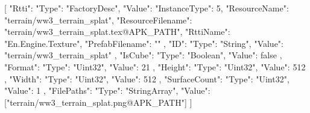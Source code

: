 [{
        "Rtti": {
            "Type": "FactoryDesc",
            "Value": {
                "InstanceType": 5,
                "ResourceName": "terrain/ww3_terrain_splat",
                "ResourceFilename": "terrain/ww3_terrain_splat.tex@APK_PATH",
                "RttiName": "En.Engine.Texture",
                "PrefabFilename": ""
            }
        },
        "ID": {
            "Type": "String",
            "Value": "terrain/ww3_terrain_splat"
        },
        "IsCube": {
            "Type": "Boolean",
            "Value": false
        },
        "Format": {
            "Type": "Uint32",
            "Value": 21
        },
        "Height": {
            "Type": "Uint32",
            "Value": 512
        },
        "Width": {
            "Type": "Uint32",
            "Value": 512
        },
        "SurfaceCount": {
            "Type": "Uint32",
            "Value": 1
        },
        "FilePaths": {
            "Type": "StringArray",
            "Value": ["terrain/ww3_terrain_splat.png@APK_PATH"]
        }
    }]